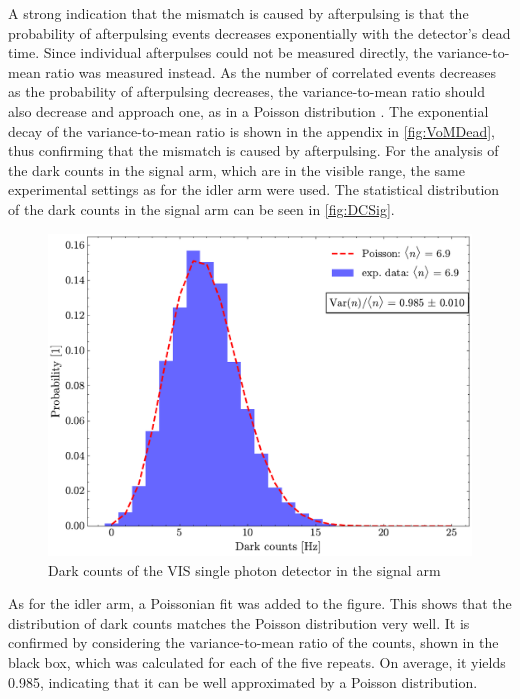 A strong indication that the mismatch is caused by afterpulsing is that the probability of afterpulsing events decreases exponentially with the detector's dead time. Since individual afterpulses could not be measured directly, the variance-to-mean ratio was measured instead. As the number of correlated events decreases as the probability of afterpulsing decreases, the variance-to-mean ratio should also decrease and approach one, as in a Poisson distribution \cite{humerSimpleRobustMethod2015}. The exponential decay of the variance-to-mean ratio is shown in the appendix in \autoref{fig:VoMDead}, thus confirming that the mismatch is caused by afterpulsing. \newline
For the analysis of the dark counts in the signal arm, which are in the visible range, the same experimental settings as for the idler arm were used. The statistical distribution of the dark counts in the signal arm can be seen in \autoref{fig:DCSig}.
\begin{figure}[tb!]
	\centering
	\includegraphics[width=.7\textwidth]{Images/DC_Sig.pdf}
	\caption{Dark counts of the VIS single photon detector in the signal arm}
	\label{fig:DCSig}
\end{figure}
As for the idler arm, a Poissonian fit was added to the figure. This shows that the distribution of dark counts matches the Poisson distribution very well. It is confirmed by considering the variance-to-mean ratio of the counts, shown in the black box, which was calculated for each of the five repeats. On average, it yields 0.985, indicating that it can be well approximated by a Poisson distribution.



